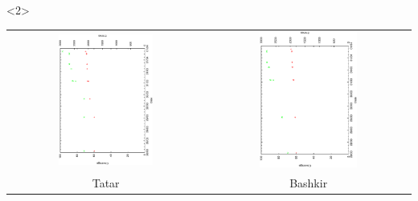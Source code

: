 \documentclass[10pt,xetex]{beamer} %
\begin{document}
\begin{frame}[fragile]
\begin{onlyenv}
\begin{center}
\end{center}
\end{onlyenv}

\begin{onlyenv}<2>
\begin{center}
\begin{tabular}{cc}
\includegraphics[angle=270,width=0.5\textwidth]{hist-tt-mar.ps} &  \includegraphics[angle=270,width=0.5\textwidth]{hist-ba-mar.ps} \\
Tatar & Bashkir \\
\end{tabular}
\end{center}
\end{onlyenv}


\end{frame}
\end{document}
